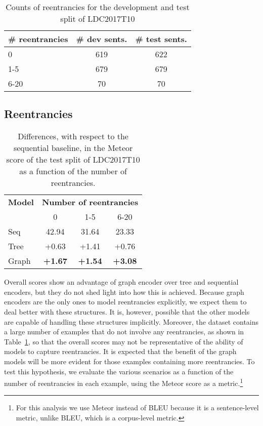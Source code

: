 \documentclass[11pt,a4paper]{article}
\begin{document}
\begin{table}
\centering
\begin{tabular}{lcc}
\toprule
\textbf{\# reentrancies} & \textbf{\# dev sents.} & \textbf{\# test sents.}\\
\midrule
0 & 619 & 622 \\
1-5 & 679 & 679 \\
6-20 & 70 & 70 \\
\bottomrule
\end{tabular}
\caption{Counts of reentrancies for the development and test split of LDC2017T10}
\label{tab:stats_reentrancies}
\end{table}

\subsection{Reentrancies}
\label{sec:reentrancies}
% 
\begin{table}
\centering
\begin{tabular}{lccc}
\toprule
\textbf{Model} & \multicolumn{3}{c}{\textbf{Number of reentrancies}}\\
 & 0 & 1-5 & 6-20\\
\midrule
{\sc Seq} & 42.94 & 31.64 & 23.33 \\
{\sc Tree} & +0.63 & +1.41 & +0.76 \\ 
{\sc Graph} & \textbf{+1.67} & \textbf{+1.54} & \textbf{+3.08} \\
\bottomrule
\end{tabular}
\caption{Differences, with respect to the sequential baseline, in the Meteor score of the test split of LDC2017T10 as a function of the number of reentrancies.}
\label{tab:diff_reentr}
\end{table}

Overall scores show an advantage of graph encoder over tree and sequential encoders, but they do not shed light into how this is achieved. Because graph encoders are the only ones to model reentrancies explicitly, we expect them to deal better with these structures. It is, however, possible that the other models are capable of handling these structures implicitly. Moreover, the dataset contains a large number of examples that do not involve any reentrancies, as shown in Table~\ref{tab:stats_reentrancies}, so that the overall scores may not be representative of the ability of models to capture reentrancies.
It is expected that the benefit of the graph models will be more evident for those examples containing more reentrancies. To test this hypothesis, we evaluate the various scenarios as a function of the number of reentrancies in each example, using the Meteor score as a metric.\footnote{For this analysis we use Meteor instead of BLEU because it is a sentence-level metric, unlike BLEU, which is a corpus-level metric.}
\end{document}
